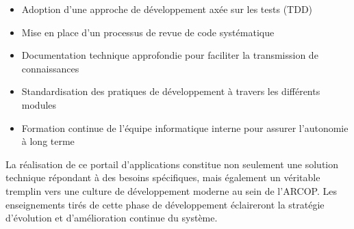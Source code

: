 \begin{itemize}
    \item Adoption d'une approche de développement axée sur les tests (TDD)
    \item Mise en place d'un processus de revue de code systématique
    \item Documentation technique approfondie pour faciliter la transmission de connaissances
    \item Standardisation des pratiques de développement à travers les différents modules
    \item Formation continue de l'équipe informatique interne pour assurer l'autonomie à long terme
\end{itemize}

La réalisation de ce portail d'applications constitue non seulement une solution technique répondant à des besoins spécifiques, mais également un véritable tremplin vers une culture de développement moderne au sein de l'ARCOP. Les enseignements tirés de cette phase de développement éclaireront la stratégie d'évolution et d'amélioration continue du système.

\clearpage